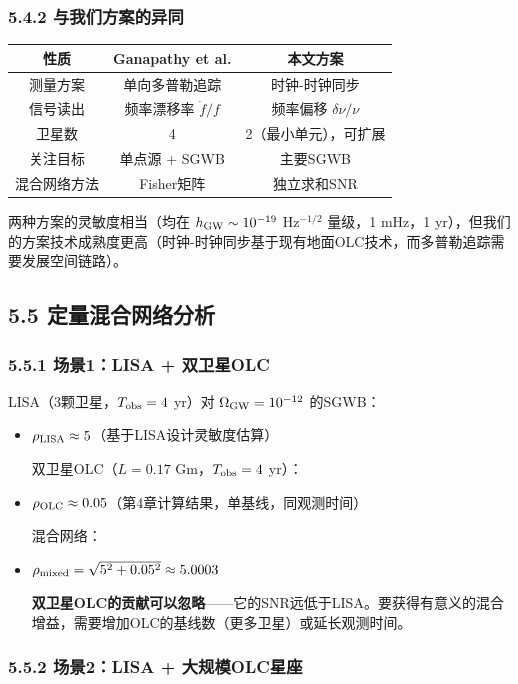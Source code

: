 \documentclass[12pt,a4paper]{article}
\begin{document}
\subsubsection{5.4.2 与我们方案的异同}


\begin{tabular}{|c|c|c|}
\hline
性质 & Ganapathy et al. & 本文方案 \\
\hline
测量方案 & 单向多普勒追踪 & 时钟-时钟同步 \\
信号读出 & 频率漂移率 $\dot{f}/f$ & 频率偏移 $\delta\nu/\nu$ \\
卫星数 & 4 & 2（最小单元），可扩展 \\
关注目标 & 单点源 + SGWB & 主要SGWB \\
混合网络方法 & Fisher矩阵 & 独立求和SNR \\
\hline
\end{tabular}


两种方案的灵敏度相当（均在 $h_{\rm GW} \sim 10^{-19}$ Hz$^{-1/2}$ 量级，1 mHz，1 yr），但我们的方案技术成熟度更高（时钟-时钟同步基于现有地面OLC技术，而多普勒追踪需要发展空间链路）。

\subsection{5.5 定量混合网络分析}


\subsubsection{5.5.1 场景1：LISA + 双卫星OLC}


LISA（3颗卫星，$T_{\rm obs} = 4$ yr）对 $\Omega_{\rm GW} = 10^{-12}$ 的SGWB：
\begin{itemize}
  \item $\rho_{\rm LISA} \approx 5$（基于LISA设计灵敏度估算）

双卫星OLC（$L = 0.17$ Gm，$T_{\rm obs} = 4$ yr）：
  \item $\rho_{\rm OLC} \approx 0.05$（第4章计算结果，单基线，同观测时间）

混合网络：
  \item $\rho_{\rm mixed} = \sqrt{5^2 + 0.05^2} \approx 5.0003$

\textbf{双卫星OLC的贡献可以忽略}——它的SNR远低于LISA。要获得有意义的混合增益，需要增加OLC的基线数（更多卫星）或延长观测时间。

\end{itemize}
\subsubsection{5.5.2 场景2：LISA + 大规模OLC星座}
\end{document}
